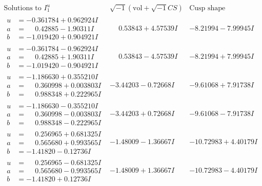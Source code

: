\documentclass[1p]{elsarticle_modified}
\theoremstyle{definition}
\newcommand{\I}{\sqrt{-1}}
\begin{document}
$$\begin{array}{c|c|c}  
\text{Solutions to }I^u_{1}& \I (\text{vol} + \sqrt{-1}CS) & \text{Cusp shape}\\
 \hline 
\begin{aligned}
u &= -0.361784 + 0.962924 I \\
a &= \phantom{-}0.42885 - 1.90311 I \\
b &= -1.019420 + 0.904921 I\end{aligned}
 & \phantom{-}0.53843 + 4.57539 I & -8.21994 - 7.99945 I \\ \hline\begin{aligned}
u &= -0.361784 - 0.962924 I \\
a &= \phantom{-}0.42885 + 1.90311 I \\
b &= -1.019420 - 0.904921 I\end{aligned}
 & \phantom{-}0.53843 - 4.57539 I & -8.21994 + 7.99945 I \\ \hline\begin{aligned}
u &= -1.186630 + 0.355210 I \\
a &= \phantom{-}0.360998 + 0.003803 I \\
b &= \phantom{-}0.988348 + 0.222965 I\end{aligned}
 & -3.44203 - 0.72668 I & -9.61068 + 7.91738 I \\ \hline\begin{aligned}
u &= -1.186630 - 0.355210 I \\
a &= \phantom{-}0.360998 - 0.003803 I \\
b &= \phantom{-}0.988348 - 0.222965 I\end{aligned}
 & -3.44203 + 0.72668 I & -9.61068 - 7.91738 I \\ \hline\begin{aligned}
u &= \phantom{-}0.256965 + 0.681325 I \\
a &= \phantom{-}0.565680 + 0.993565 I \\
b &= -1.41820 - 0.12736 I\end{aligned}
 & -1.48009 - 1.36667 I & -10.72983 + 4.40179 I \\ \hline\begin{aligned}
u &= \phantom{-}0.256965 - 0.681325 I \\
a &= \phantom{-}0.565680 - 0.993565 I \\
b &= -1.41820 + 0.12736 I\end{aligned}
 & -1.48009 + 1.36667 I & -10.72983 - 4.40179 I \\ \hline\begin{aligned}

\end{aligned}
\end{array}$$
\end{document}
